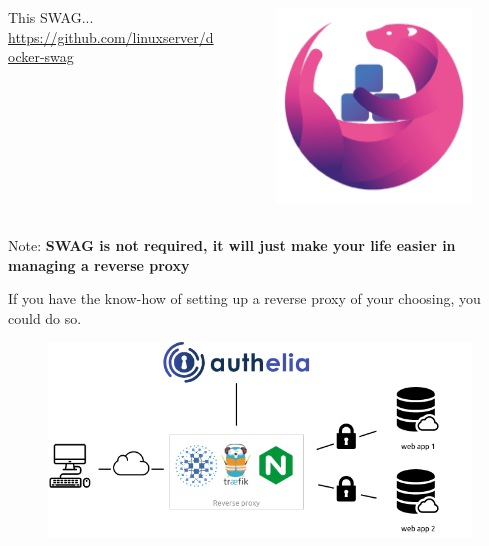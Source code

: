 \documentclass{beamer}
\begin{document}
\begin{frame}
    \begin{columns}
        \begin{column}{0.7\textwidth}
            This SWAG... \href{https://github.com/linuxserver/docker-swag}{https://github.com/linuxserver/docker-swag}
        \end{column}
        \begin{column}{0.3\textwidth}
            \begin{figure}
                \centering
                \includegraphics[width=1\textwidth,keepaspectratio]{../resources/swag.png}
            \end{figure}
        \end{column}
    \end{columns}
\end{frame}

\begin{frame}
    Note: \textbf{SWAG is not required, it will just make your life easier in managing a reverse proxy}


    If you have the know-how of setting up a reverse proxy of your choosing, you could do so.

    \begin{figure}
        \centering
        \includegraphics[width=1\textwidth,keepaspectratio]{../resources/archi.png}
    \end{figure}
\end{frame}
\end{document}
